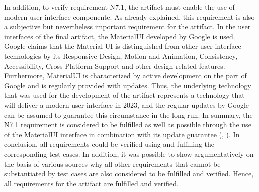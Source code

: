 In addition, to verify requirement N7.1, the artifact must enable the use of modern user interface componente. As already explained, this requirement is also a subjective but nevertheless important requirement for the artifact. In the user interfaces of the final artifact, the MaterialUI developed by Google is used. Google claims that the Material UI is distinguished from other user interface technologies by its Responsive Design, Motion and Animation, Consistency, Accessibility, Cross-Platform Support and other design-related features. Furthermore, MaterialUI is characterized by active development on the part of Google and is regularly provided with updates. Thus, the underlying \cite{ui} technology that was used for the development of the artifact represents a \cite{ui} technology that will deliver a modern user interface in 2023, and the regular updates by Google can be assumed to guarantee this circumstance in the long run. In summary, the N7.1 requirement is considered to be fulfilled as well as possible through the use of the MaterialUI interface in combination with its update guarantee (\cite{Google.2023c}, \cite{Google.2023}). In conclusion, all requirements could be verified using and fulfilling the corresponding test cases. In addition, it was possible to show argumentatively on the basis of various sources why all other requirements that cannot be substantiated by test cases are also considered to be fulfilled and verified. Hence, all requirements for the artifact are fulfilled and verified.

